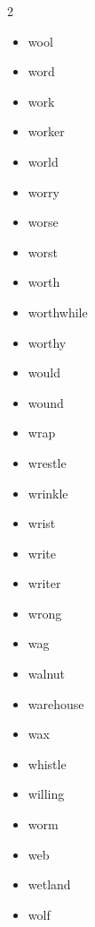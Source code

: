 \documentclass[../../book.tex]{subfiles}
\begin{document}
\begin{multicols}{2}
\begin{itemize}
\item[-] wool
\item[-] word
\item[-] work
\item[-] worker
\item[-] world
\item[-] worry
\item[-] worse
\item[-] worst
\item[-] worth
\item[-] worthwhile
\item[-] worthy
\item[-] would
\item[-] wound
\item[-] wrap
\item[-] wrestle
\item[-] wrinkle
\item[-] wrist
\item[-] write
\item[-] writer
\item[-] wrong
\item[-] wag
\item[-] walnut
\item[-] warehouse
\item[-] wax
\item[-] whistle
\item[-] willing
\item[-] worm
\item[-] web
\item[-] wetland
\item[-] wolf
\end{itemize}
\end{multicols}
\end{document}

